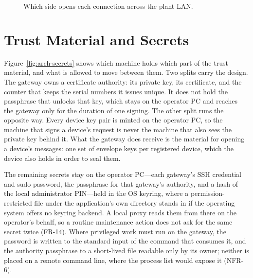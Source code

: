\documentclass[12pt,a4paper]{report}
\begin{document}
\begin{figure}[htbp]
{%
}
\caption{Which side opens each connection across the plant
LAN.}
\label{fig:arch-topology}
\end{figure}

\section{Trust Material and Secrets}
\label{sec:arch-secrets}

Figure~\ref{fig:arch-secrets} shows which machine holds
which part of the trust material, and what is allowed to
move between them. Two splits carry the design.
The gateway owns a certificate authority: its private
key, its certificate, and the counter that keeps the
serial numbers it issues unique. It does not hold the
passphrase that unlocks that key, which stays on the
operator PC and reaches the gateway only for the
duration of one signing. The other split runs the
opposite way. Every device key pair is minted on the
operator PC, so the machine that signs a device's
request is never the machine that also sees the private
key behind it. What the gateway does receive is the
material for opening a device's messages: one set of
envelope keys per registered device, which the device
also holds in order to seal them.

The remaining secrets stay on the operator PC---each
gateway's SSH credential and sudo password, the
passphrase for that gateway's authority, and a hash of
the local administrator PIN---held in the OS keyring,
where a permission-restricted file under the
application's own directory stands in if the operating
system offers no keyring backend. A local proxy reads
them from there on the operator's behalf, so a routine
maintenance action does not ask for the same secret
twice (FR-14). Where privileged work must run on the
gateway, the password is written to the standard input
of the command that consumes it, and the authority
passphrase to a short-lived file readable only by its
owner; neither is placed on a remote command line, where
the process list would expose it (NFR-6).
\end{document}
